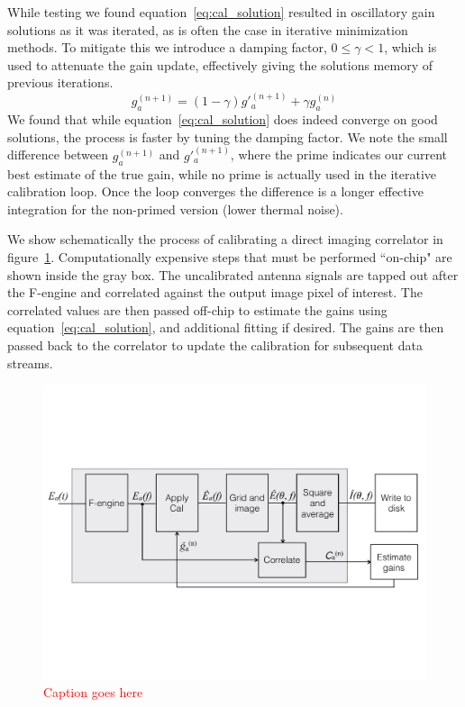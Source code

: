 \documentclass[a4paper,fleqn,usenatbib]{../mnras}
\newcommand{\damp}{\ensuremath{\gamma}}
\begin{document}
While testing we found equation~\ref{eq:cal_solution} resulted in oscillatory gain solutions as it was iterated, as is often the case in iterative minimization methods. To mitigate this we introduce a damping factor, $0 \leq \damp <1$, which is used to attenuate the gain update, effectively giving the solutions memory of previous iterations.
\begin{equation}
g^{(n+1)}_a = (1-\damp) g'^{(n+1)}_a + \damp g^{(n)}_a
\end{equation}
We found that while equation~\ref{eq:cal_solution} does indeed converge on good solutions, the process is faster by tuning the damping factor. We note the small difference between $g^{(n+1)}_a$ and $g'^{(n+1)}_a$, where the prime indicates our current best estimate of the true gain, while no prime is actually used in the iterative calibration loop. Once the loop converges the difference is a longer effective integration for the non-primed version (lower thermal noise). 

We show schematically the process of calibrating a direct imaging correlator in figure~\ref{fig:schematic}. Computationally expensive steps that must be performed ``on-chip" are shown inside the gray box. The uncalibrated antenna signals are tapped out after the F-engine and correlated against the output image pixel of interest. The correlated values are then passed off-chip to estimate the gains using equation~\ref{eq:cal_solution}, and additional fitting if desired. The gains are then passed back to the correlator to update the calibration for subsequent data streams. 

\begin{figure}
\begin{center}
\includegraphics[width=\columnwidth]{figures/schematic.pdf}
\caption{\textcolor{red}{Caption goes here}}
\label{fig:schematic}
\end{center}
\end{figure}
\end{document}
